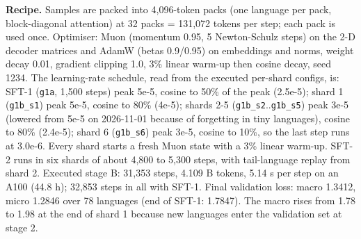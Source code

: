 \textbf{Recipe.} Samples are packed into 4,096-token packs (one language per pack, block-diagonal attention) at 32 packs = 131,072 tokens per step; each pack is used once. Optimiser: Muon (momentum 0.95, 5 Newton-Schulz steps) on the 2-D decoder matrices and AdamW (betas 0.9/0.95) on embeddings and norms, weight decay 0.01, gradient clipping 1.0, 3\% linear warm-up then cosine decay, seed 1234. The learning-rate schedule, read from the executed per-shard configs, is: SFT-1 (\texttt{g1a}, 1,500 steps) peak 5e-5, cosine to 50\% of the peak (2.5e-5); shard 1 (\texttt{g1b\_\allowbreak{}s1}) peak 5e-5, cosine to 80\% (4e-5); shards 2-5 (\texttt{g1b\_\allowbreak{}s2}..\texttt{g1b\_\allowbreak{}s5}) peak 3e-5 (lowered from 5e-5 on 2026-11-01 because of forgetting in tiny languages), cosine to 80\% (2.4e-5); shard 6 (\texttt{g1b\_\allowbreak{}s6}) peak 3e-5, cosine to 10\%, so the last step runs at 3.0e-6. Every shard starts a fresh Muon state with a 3\% linear warm-up. SFT-2 runs in six shards of about 4,800 to 5,300 steps, with tail-language replay from shard 2. Executed stage B: 31,353 steps, 4.109 B tokens, 5.14 s per step on an A100 (44.8 h); 32,853 steps in all with SFT-1. Final validation loss: macro 1.3412, micro 1.2846 over 78 languages (end of SFT-1: 1.7847). The macro rises from 1.78 to 1.98 at the end of shard 1 because new languages enter the validation set at stage 2.  

